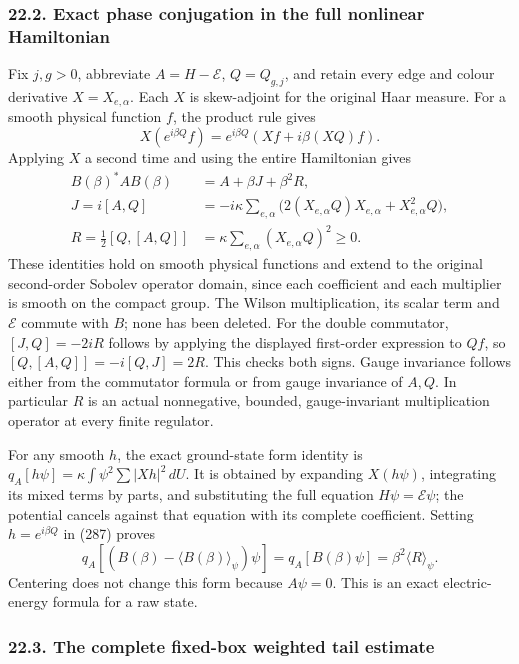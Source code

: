 \documentclass[
  11pt,
]{article}
\begin{document}
\subsubsection{22.2. Exact phase conjugation in the full nonlinear
Hamiltonian}\label{exact-phase-conjugation-in-the-full-nonlinear-hamiltonian}

Fix \(j,g>0\), abbreviate \(A=H-\mathcal E\), \(Q=Q_{g,j}\), and retain
every edge and colour derivative \(X=X_{e,\alpha}\). Each \(X\) is
skew-adjoint for the original Haar measure. For a smooth physical
function \(f\), the product rule gives \[
 X(e^{i\beta Q}f)
 =e^{i\beta Q}(Xf+i\beta(XQ)f).
 \tag{287}
\] Applying \(X\) a second time and using the entire Hamiltonian gives
\[
 \begin{split}
 B(\beta)^*AB(\beta)&=A+\beta J+\beta^2R,\\
 J=i[A,Q]&=-i\kappa\sum_{e,\alpha}
       \bigl(2(X_{e,\alpha}Q)X_{e,\alpha}
                    +X_{e,\alpha}^2Q\bigr),\\
 R=\tfrac12[Q,[A,Q]]
     &=\kappa\sum_{e,\alpha}(X_{e,\alpha}Q)^2\ge0 .
 \end{split}
 \tag{288}
\] These identities hold on smooth physical functions and extend to the
original second-order Sobolev operator domain, since each coefficient
and each multiplier is smooth on the compact group. The Wilson
multiplication, its scalar term and \(\mathcal E\) commute with \(B\);
none has been deleted. For the double commutator, \([J,Q]=-2iR\) follows
by applying the displayed first-order expression to \(Qf\), so
\([Q,[A,Q]]=-i[Q,J]=2R\). This checks both signs. Gauge invariance
follows either from the commutator formula or from gauge invariance of
\(A,Q\). In particular \(R\) is an actual nonnegative, bounded,
gauge-invariant multiplication operator at every finite regulator.

For any smooth \(h\), the exact ground-state form identity is
\(q_A[h\psi]=\kappa\int\psi^2\sum|Xh|^2\,dU\). It is obtained by
expanding \(X(h\psi)\), integrating its mixed terms by parts, and
substituting the full equation \(H\psi=\mathcal E\psi\); the potential
cancels against that equation with its complete coefficient. Setting
\(h=e^{i\beta Q}\) in (287) proves \[
 q_A[(B(\beta)-\langle B(\beta)\rangle_\psi)\psi]
 =q_A[B(\beta)\psi]=\beta^2\langle R\rangle_\psi .
 \tag{289}
\] Centering does not change this form because \(A\psi=0\). This is an
exact electric-energy formula for a raw state.

\subsubsection{22.3. The complete fixed-box weighted tail
estimate}\label{the-complete-fixed-box-weighted-tail-estimate}
\end{document}
